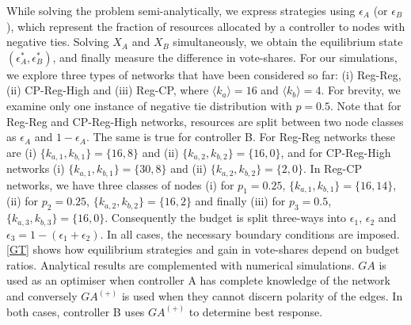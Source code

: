  While solving the problem semi-analytically, we express strategies using $\epsilon_{A}$ (or $\epsilon_{B}$), which represent the fraction of resources allocated by a controller to nodes with negative ties. Solving $X_{A}$ and $X_{B}$ simultaneously, we obtain the equilibrium state $(\epsilon_{A}^{*},\epsilon_{B}^{*})$, and finally measure the difference in vote-shares. 
 For our simulations, we explore three types of networks that have been considered so far: (i) Reg-Reg, (ii) CP-Reg-High and (iii) Reg-CP, where $\langle k_{a} \rangle=16$ and $\langle k_{b} \rangle=4$. For brevity, we examine only one instance of negative tie distribution with $p=0.5$. 
Note that for Reg-Reg and CP-Reg-High networks, resources are split between two node classes as $\epsilon_{A}$ and $1-\epsilon_{A}$. The same is true for controller B. For Reg-Reg networks these are (i) $\{k_{a,1},k_{b,1}\}=\{16,8\}$ and (ii) $\{k_{a,2},k_{b,2}\}=\{16,0\}$, and for CP-Reg-High networks (i) $\{k_{a,1},k_{b,1}\}=\{30,8\}$ and (ii) $\{k_{a,2},k_{b,2}\}=\{2,0\}$. In Reg-CP networks, we have three classes of nodes (i) for $p_{1}=0.25$, $\{k_{a,1},k_{b,1}\}=\{16,14\}$, (ii) for $p_{2}=0.25$, $\{k_{a,2},k_{b,2}\}=\{16,2\}$ and finally (iii) for $p_{3}=0.5$, $\{k_{a,3},k_{b,3}\}=\{16,0\}$. Consequently the budget is split three-ways into $\epsilon_{1}$, $\epsilon_{2}$ and $\epsilon_{3} = 1 - (\epsilon_{1}+\epsilon_{2})$.  
 In all cases, the necessary boundary conditions are imposed. 
 \cref{GT} shows how equilibrium strategies and gain in vote-shares depend on budget ratios. Analytical results are complemented with numerical simulations. $GA$ is used as an optimiser when controller A has complete knowledge of the network and conversely $GA^{(+)}$ is used when they cannot discern polarity of the edges. In both cases, controller B uses $GA^{(+)}$ to determine best response. 
 
